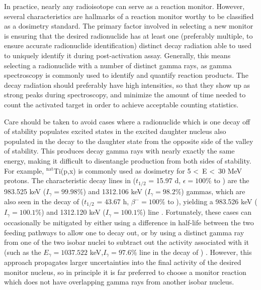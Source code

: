 \documentclass[3p]{elsarticle}
\begin{document}
In practice, nearly any radioisotope can serve as a reaction monitor. 
However, several characteristics are hallmarks of a reaction monitor worthy to be classified as a dosimetry standard.
The primary factor involved in selecting a new monitor is ensuring that the desired radionuclide has  at least one (preferably multiple, to ensure accurate radionuclide identification) distinct decay radiation able to used to uniquely identify it during post-activation assay.  
Generally, this means selecting a radionuclide with a number of distinct gamma rays, as gamma spectroscopy is commonly used to identify and quantify reaction products.
The decay radiation should preferably have high intensities, so that they show up as strong peaks during spectroscopy, and minimize the amount of time needed to count the activated target in order to achieve acceptable counting statistics. 

Care should be taken to avoid cases where a radionuclide which is one decay off of stability populates excited states in the excited daughter nucleus also populated in the decay to the daughter state from the opposite side of the valley of stability.
This produces decay gamma rays with nearly exactly the same energy, making it difficult to disentangle production from both sides of stability.
For example, $^\text{nat}$Ti(p,x) is commonly used as dosimetry for 5 \textless\ E \textless\ 30 MeV protons.
The characteristic decay lines in   ($t_{1/2}$ = 15.97 d, $\epsilon=100\%$ to ) are the 983.525 keV ($I_\gamma=99.98\%$) and 1312.106 keV ($I_\gamma=98.2\%$) gammas, which are also seen in the decay of   ($t_{1/2}$ = 43.67 h, $\beta^-=100\%$ to ), yielding  a 983.526 keV ($I_\gamma=100.1\%$) and 1312.120 keV ($I_\gamma=100.1\%$) line \cite{Burrows2006}.
Fortunately, these cases can occasionally be mitigated by either using a difference in half-life between the two feeding pathways to allow one to decay out, or by using a distinct gamma ray from one of the two isobar nuclei to subtract out the activity associated with it (such as the $E_\gamma=1037.522$ keV,$I_\gamma=97.6\%$ line in the decay of ) \cite{Burrows2006}.
However, this approach propagates larger uncertainties into the final activity of the desired monitor nucleus, so in principle it is far preferred to choose a monitor reaction which does not have overlapping gamma rays from another isobar nucleus.
\end{document}
